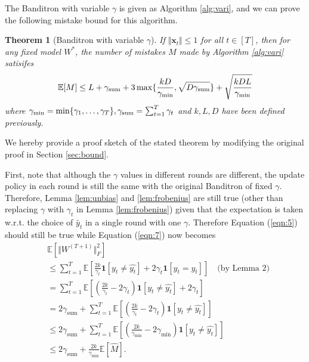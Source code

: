 \documentclass{article}
\newtheorem{theorem}{Theorem}
\begin{document}
The Banditron with variable $\gamma$ is given as Algorithm \ref{alg:vari}, and we can prove the following mistake bound for this algorithm.

\begin{theorem}[Banditron with variable $\gamma$]\label{thm:2}
    If $\Vert \mathbf{x}_t\Vert\leq1$ for all $t\in[T]$, then for any fixed model $W^*$, the number of mistakes $M$ made by Algorithm \ref{alg:vari} satisifes
    \begin{equation}
        \mathbb{E}[M]\leq L+\gamma_{\textup{sum}}+3\max\{\frac{kD}{\gamma_{\min}},\sqrt{D\gamma_{\textup{sum}}}\}+\sqrt{\frac{kDL}{\gamma_{\min}}}
    \end{equation} where $\gamma_{\min}=\min\{\gamma_1,\ldots,\gamma_T\},\gamma_{\textup{sum}}=\sum_{t=1}^T\gamma_t$ and $k,L,D$ have been defined previously.
\end{theorem}

We hereby provide a proof sketch of the stated theorem by modifying the original proof in Section \ref{sec:bound}.

First, note that although the $\gamma$ values in different rounds are different, the update policy in each round is still the same with the original Banditron of fixed $\gamma$. Therefore, Lemma \ref{lem:unbias} and \ref{lem:frobenius} are still true (other than replacing $\gamma$ with $\gamma_t$ in Lemma \ref{lem:frobenius}) given that the expectation is taken w.r.t. the choice of $\tilde{y_t}$ in a single round with one $\gamma$. Therefore Equation (\ref{eqn:5}) should still be true while Equation (\ref{eqn:7}) now becomes
\begin{equation}
    \begin{aligned}
        &\mathbb{E}[\Vert W^{(T+1)}\Vert_F^2]\\
        &\leq\sum_{t=1}^T\mathbb{E}[\frac{2k}{\gamma_t}\mathbf{1}[y_t\neq \hat{y_t}]+2\gamma_t\mathbf{1}[y_t=\hat{y_t}]]\quad\text{(by Lemma 2)}\\
        &=\sum_{t=1}^T\mathbb{E}\left[\left(\frac{2k}{\gamma_t}-2\gamma_t\right)\mathbf{1}[y_t\neq\hat{y_t}]+2\gamma_t\right]\\
        &=2\gamma_{\text{sum}}+\sum_{t=1}^T\mathbb{E}\left[\left(\frac{2k}{\gamma_t}-2\gamma_t\right)\mathbf{1}[y_t\neq\hat{y_t}]\right]\\
        &\leq2\gamma_{\text{sum}}+\sum_{t=1}^T\mathbb{E}\left[\left(\frac{2k}{\gamma_{\min}}-2\gamma_{\min}\right)\mathbf{1}[y_t\neq\hat{y_t}]\right]\\
        &\leq2\gamma_{\text{sum}}+\frac{2k}{\gamma_{\min}}\mathbb{E}[\hat{M}].
    \end{aligned}
\end{equation}
\end{document}
